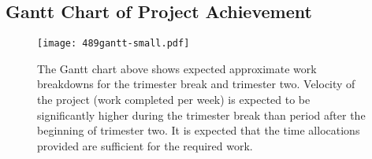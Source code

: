 \begin{appendices}
\chapter{Gantt Chart of Project Achievement}

\begin{figure}[H]
\centering
	\texttt{[image: 489gantt-small.pdf]}
	\caption{The Gantt chart above shows expected approximate work breakdowns for the trimester break and trimester two. Velocity of the project (work completed per week) is expected to be significantly higher during the trimester break than period after the beginning of trimester two. It is expected that the time allocations provided are sufficient for the required work. }
\label{ganttchart}
\end{figure}

\end{appendices}